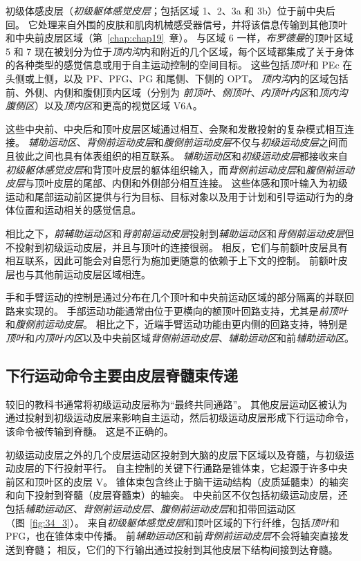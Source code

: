 初级体感皮层（\textit{初级躯体感觉皮层}；包括区域 1、2、3a 和 3b）位于前中央后回。
它处理来自外围的皮肤和肌肉机械感受器信号，并将该信息传输到其他顶叶和中央前皮层区域（第~\ref{chap:chap19}~章）。
与区域 6 一样，\textit{布罗德曼}的顶叶区域 5 和 7 现在被划分为位于\textit{顶内沟}内和附近的几个区域，每个区域都集成了关于身体的各种类型的感觉信息或用于自主运动控制的空间目标。
这些包括\textit{顶叶}和 PEc 在头侧或上侧，以及 PF、PFG、PG 和尾侧、下侧的 OPT。
\textit{顶内沟}内的区域包括前、外侧、内侧和腹侧顶内区域（分别为 \textit{前顶叶}、\textit{侧顶叶}、\textit{内顶叶内区}和\textit{顶内沟腹侧区}）以及\textit{顶内区}和更高的视觉区域 V6A。


这些中央前、中央后和顶叶皮层区域通过相互、会聚和发散投射的复杂模式相互连接。
\textit{辅助运动区}、\textit{背侧前运动皮层}和\textit{腹侧前运动皮层}不仅与\textit{初级运动皮层}之间而且彼此之间也具有体表组织的相互联系。
\textit{辅助运动区}和\textit{初级运动皮层}都接收来自\textit{初级躯体感觉皮层}和背顶叶皮层的躯体组织输入，而\textit{背侧前运动皮层}和\textit{腹侧前运动皮层}与顶叶皮层的尾部、内侧和外侧部分相互连接。
这些体感和顶叶输入为初级运动和尾部运动前区提供与行为目标、目标对象以及用于计划和引导运动行为的身体位置和运动相关的感觉信息。


相比之下，\textit{前辅助运动区}和\textit{背前前运动皮层}投射到\textit{辅助运动区}和\textit{背侧前运动皮层}但不投射到初级运动皮层，并且与顶叶的连接很弱。
相反，它们与前额叶皮层具有相互联系，因此可能会对自愿行为施加更随意的依赖于上下文的控制。
前额叶皮层也与其他前运动皮层区域相连。


手和手臂运动的控制是通过分布在几个顶叶和中央前运动区域的部分隔离的并联回路来实现的。
手部运动功能通常由位于更横向的额顶叶回路支持，尤其是\textit{前顶叶}和\textit{腹侧前运动皮层}。
相比之下，近端手臂运动功能由更内侧的回路支持，特别是\textit{顶叶}和\textit{内顶叶内区}以及中央前区域\textit{背侧前运动皮层}、\textit{辅助运动区}和前\textit{辅助运动区}。



\subsection{下行运动命令主要由皮层脊髓束传递}

较旧的教科书通常将初级运动皮层称为“最终共同通路”。
其他皮层运动区被认为通过投射到初级运动皮层来影响自主运动，然后初级运动皮层形成下行运动命令，该命令被传输到脊髓。
这是不正确的。


初级运动皮层之外的几个皮层运动区投射到大脑的皮层下区域以及脊髓，与初级运动皮层的下行投射平行。
自主控制的关键下行通路是锥体束，它起源于许多中央前区和顶叶区的皮层 V。
锥体束包含终止于脑干运动结构（皮质延髓束）的轴突和向下投射到脊髓（皮层脊髓束）的轴突。
中央前区不仅包括初级运动皮层，还包括\textit{辅助运动区}、\textit{背侧前运动皮层}、\textit{腹侧前运动皮层}和扣带回运动区（图~\ref{fig:34_3}）。
来自\textit{初级躯体感觉皮层}和顶叶区域的下行纤维，包括\textit{顶叶}和 PFG，也在锥体束中传播。
前\textit{辅助运动区}和前\textit{背侧前运动皮层}不会将轴突直接发送到脊髓；
相反，它们的下行输出通过投射到其他皮层下结构间接到达脊髓。


